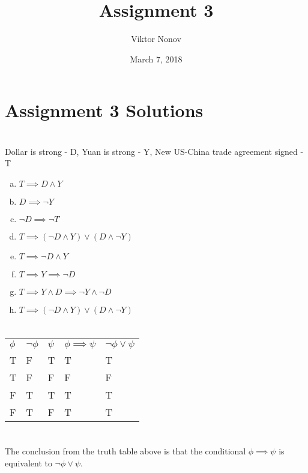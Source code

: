 \documentclass{article}
\title{Assignment 3}
\author{Viktor Nonov}
\date{March 7, 2018}
\begin{document}
\section*{Assignment 3 Solutions}

\section{}
Dollar is strong - D, Yuan is strong - Y, New US-China trade agreement signed - T

\begin{enumerate}[a.]
\item $T \implies D \wedge Y$
\item $D \implies \neg Y$
\item $\neg D \implies \neg T$
\item $T \implies (\neg D \wedge Y) \vee (D \wedge \neg Y)$
\item $T \implies \neg D \wedge Y$
\item $T \implies Y \implies \neg D$
\item $T \implies Y \wedge D \implies \neg Y \wedge \neg D$
\item $T \implies (\neg D \wedge Y) \vee (D \wedge \neg Y)$
\end{enumerate}

\section{}
\begin{tabular}{ l l l l l }
  $\phi$ & $\neg \phi$ & $\psi$ & $\phi \implies \psi$ & $\neg \phi \vee \psi$ \\
  T      & F           & T      & T                       & T                     \\
  T      & F           & F      & F                       & F                     \\
  F      & T           & T      & T                       & T                     \\
  F      & T           & F      & T                       & T                     \\
\end{tabular}

\section{}
The conclusion from the truth table above is that the conditional $\phi \implies \psi$ is equivalent to $\neg \phi \vee \psi$.
\end{document}
